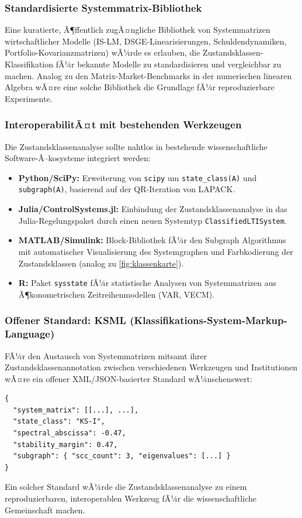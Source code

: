 ﻿\documentclass[12pt, a4paper, titlepage]{report}
\theoremstyle{definition}
\theoremstyle{remark}
\begin{document}
\subsubsection*{Standardisierte Systemmatrix-Bibliothek}

Eine kuratierte, Ã¶ffentlich zugÃ¤ngliche Bibliothek von Systemmatrizen
wirtschaftlicher Modelle (IS-LM, DSGE-Linearisierungen, Schuldendynamiken,
Portfolio-Kovarianzmatrizen) wÃ¼rde es erlauben, die Zustandsklassen-Klassifikation
fÃ¼r bekannte Modelle zu standardisieren und vergleichbar zu machen.
Analog zu den Matrix-Market-Benchmarks in der numerischen linearen Algebra
wÃ¤re eine solche Bibliothek die Grundlage fÃ¼r reproduzierbare Experimente.

\subsubsection*{InteroperabilitÃ¤t mit bestehenden Werkzeugen}

Die Zustands\-klassen\-analyse sollte nahtlos in bestehende wissenschaftliche
Software-Ã–ko\-systeme integriert werden:
\begin{itemize}
  \item \textbf{Python/SciPy:} Erweiterung von \texttt{scipy} um
    \texttt{state\_class(A)} und \texttt{subgraph(A)},
    basierend auf der QR-Iteration von LAPACK.
  \item \textbf{Julia/ControlSystems.jl:} Einbindung der Zustandsklassenanalyse
    in das Julia-Regelungspaket durch einen neuen Systemtyp \texttt{ClassifiedLTISystem}.
  \item \textbf{MATLAB/Simulink:} Block-Bibliothek fÃ¼r den Subgraph Algorithmus
    mit automatischer Visualisierung des Systemgraphen und Farbkodierung
    der Zustandsklassen (analog zu \cref{fig:klassenkarte}).
  \item \textbf{R:} Paket \texttt{sysstate} fÃ¼r statistische Analysen von
    Systemmatrizen aus Ã¶konometrischen Zeitreihenmodellen (VAR, VECM).
\end{itemize}

\subsubsection*{Offener Standard: KSML (Klassifikations-System-Markup-Language)}

FÃ¼r den Austausch von Systemmatrizen mitsamt ihrer Zustandsklassenannotation
zwischen verschiedenen Werkzeugen und Institutionen wÃ¤re ein offener
XML/JSON-basierter Standard wÃ¼nschenswert:
\begin{verbatim}
{
  "system_matrix": [[...], ...],
  "state_class": "KS-I",
  "spectral_abscissa": -0.47,
  "stability_margin": 0.47,
  "subgraph": { "scc_count": 3, "eigenvalues": [...] }
}
\end{verbatim}
Ein solcher Standard wÃ¼rde die Zustandsklassenanalyse zu einem reproduzierbaren,
interoperablen Werkzeug fÃ¼r die wissenschaftliche Gemeinschaft machen.
\end{document}
